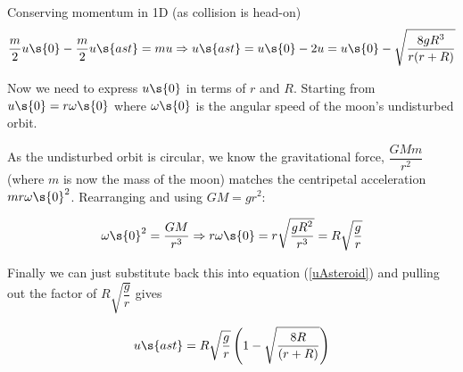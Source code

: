 \begin{problem}
{  Conserving momentum in 1D (as collision is head-on)
     \begin{equation}
 \frac{m}{2}u\s{0} - \frac{m}{2}u\s{ast} = mu \Rightarrow u\s{ast} = u\s{0} - 2u = u\s{0} - \sqrt{\dfrac{8gR^3}{r(r+R)}}
 \label{uAsteroid}
 \end{equation}
  
  Now we need to express $u\s{0}$ in terms of $r$ and $R$. Starting from $u\s{0} = r \omega\s{0}$ where $\omega\s{0}$ is the angular speed of the moon's undisturbed orbit.
  
  As the undisturbed orbit is circular, we know the gravitational force, $\dfrac{GMm}{r^2}$ (where $m$ is now the mass of the moon) matches the centripetal acceleration $mr\omega\s{0}^2$. Rearranging and using $GM = gr^2$:
  
  \begin{equation*}
  \omega\s{0}^2 = \dfrac{GM}{r^3} \Rightarrow r\omega\s{0} = r\sqrt{ \dfrac{gR^2}{r^3}} = R \sqrt{\dfrac{g}{r}}
\end{equation*}

Finally we can just substitute back this into equation (\ref{uAsteroid}) and pulling out the factor of $R\sqrt{\dfrac{g}{r}}$ gives

 \begin{equation*}
 u\s{ast} = R \sqrt{\dfrac{g}{r}} \left(1 - \sqrt{\dfrac{8R}{(r + R)} } \right)
 \end{equation*}

}
\end{problem}
